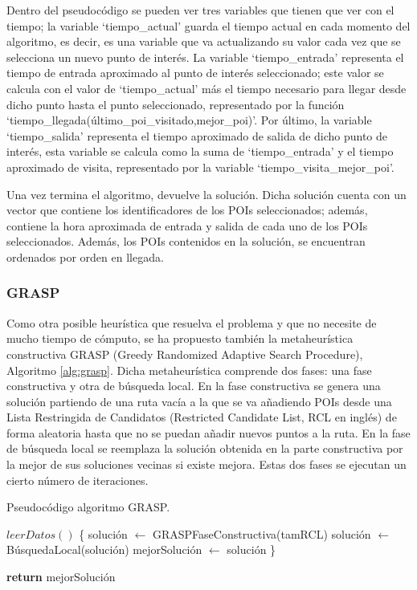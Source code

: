 Dentro del pseudocódigo se pueden ver tres variables que tienen que ver con el tiempo; la variable \enquote*{tiempo\_actual} guarda el tiempo actual en cada momento del algoritmo, es decir, es una variable que va actualizando su valor cada vez que se selecciona un nuevo punto de interés. La variable \enquote*{tiempo\_entrada} representa el tiempo de entrada aproximado al punto de interés seleccionado; este valor se calcula con el valor de \enquote*{tiempo\_actual} más el tiempo necesario para llegar desde dicho punto hasta el punto seleccionado, representado por la función \enquote*{tiempo\_llegada(último\_poi\_visitado,mejor\_poi)}. Por último, la variable \enquote*{tiempo\_salida} representa el tiempo aproximado de salida de dicho punto de interés, esta variable se calcula como la suma de \enquote*{tiempo\_entrada} y el tiempo aproximado de visita, representado por la variable  \enquote*{tiempo\_visita\_mejor\_poi}.\newline

Una vez termina el algoritmo, devuelve la solución. Dicha solución cuenta con un vector que contiene los identificadores de los POIs seleccionados; además, contiene la hora aproximada de entrada y salida de cada uno de los POIs seleccionados. Además, los POIs contenidos en la solución, se encuentran ordenados por orden en llegada.\newline

\subsubsection{GRASP}
Como otra posible heurística que resuelva el problema y que no necesite de mucho tiempo de cómputo, se ha propuesto también la metaheurística constructiva GRASP (Greedy Randomized Adaptive Search Procedure), Algoritmo \ref{alg:grasp}. Dicha metaheurística comprende dos fases: una fase constructiva y otra de búsqueda local. En la fase constructiva se genera una solución partiendo de una ruta vacía a la que se va añadiendo POIs desde una Lista Restringida de Candidatos (Restricted Candidate List, RCL en inglés) de forma aleatoria hasta que no se puedan añadir nuevos puntos a la ruta. En la fase de búsqueda local se reemplaza la solución obtenida en la parte constructiva por la mejor de sus soluciones vecinas si existe mejora. Estas dos fases se ejecutan un cierto número de iteraciones.\newline

\newpage

\begin{algorithm}[H]
	\caption{Pseudocódigo algoritmo GRASP.}
	\label{alg:grasp}
\begin{algorithmic}
	\State $ leerDatos() $
	 \{
		\State solución $ \gets $ GRASPFaseConstructiva(tamRCL)
		\State  solución $\gets$ BúsquedaLocal(solución)
			\State  mejorSolución $\gets$ solución
		\EndIf
		\State \}
	\EndFor
	
	\State \textbf{return} mejorSolución
	\EndFunction
\end{algorithmic}
\end{algorithm}


